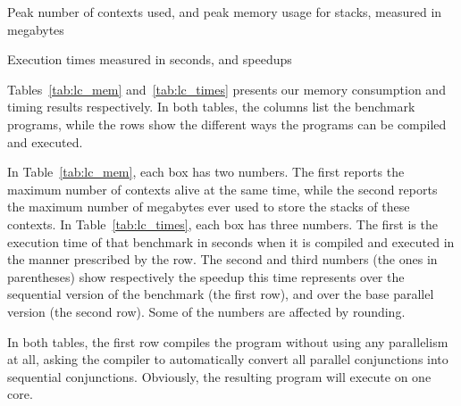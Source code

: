 \begin{sidewaystable}[tbp]
\begin{center}

\caption[Peak number of contexts used,
and peak memory usage for stacks]{Peak number of contexts used,
and peak memory usage for stacks, measured in megabytes}
\label{tab:lc_mem}
\end{center}
\end{sidewaystable}

\begin{sidewaystable}[tbp]
\begin{center}

\caption{Execution times measured in seconds, and speedups}
\label{tab:lc_times}
\end{center}
\end{sidewaystable}

Tables~\ref{tab:lc_mem} and~\ref{tab:lc_times}
presents our memory consumption and timing results respectively.
In both tables,
the columns list the benchmark programs,
while the rows show the different ways
the programs can be compiled and executed.

In Table~\ref{tab:lc_mem}, each box has two numbers.
The first reports the maximum number of contexts alive at the same time,
while the second reports the maximum number of megabytes
ever used to store the stacks of these contexts.
In Table~\ref{tab:lc_times}, each box has three numbers.
The first is the execution time of that benchmark in seconds
when it is compiled and executed in the manner prescribed by the row.
The second and third numbers (the ones in parentheses)
show respectively the speedup this time represents
over the sequential version of the benchmark (the first row),
and over the base parallel version (the second row).
Some of the numbers are affected by rounding.

In both tables, the first row
compiles the program without using any parallelism at all,
asking the compiler to automatically convert
all parallel conjunctions into sequential conjunctions.
Obviously, the resulting program will execute on one core.

